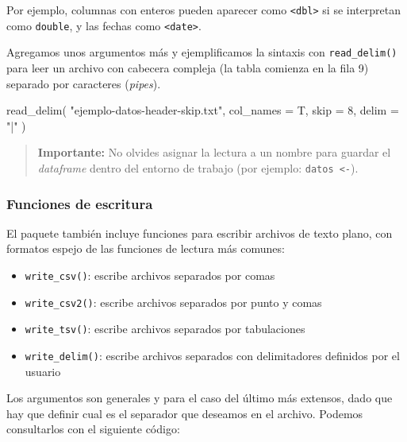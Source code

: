\documentclass[
  spanish,
  a4paper,
]{scrbook}
\newenvironment{Shaded}{\begin{snugshade}}{\end{snugshade}}
\newcommand{\AttributeTok}[1]{\textcolor[rgb]{0.40,0.45,0.13}{#1}}
\newcommand{\DecValTok}[1]{\textcolor[rgb]{0.68,0.00,0.00}{#1}}
\newcommand{\FunctionTok}[1]{\textcolor[rgb]{0.28,0.35,0.67}{#1}}
\newcommand{\NormalTok}[1]{\textcolor[rgb]{0.00,0.23,0.31}{#1}}
\newcommand{\StringTok}[1]{\textcolor[rgb]{0.13,0.47,0.30}{#1}}
\providecommand{\tightlist}{%
  \setlength{\itemsep}{0pt}\setlength{\parskip}{0pt}}
\begin{document}
Por ejemplo, columnas con enteros pueden aparecer como
\texttt{\textless{}dbl\textgreater{}} si se interpretan como
\texttt{double}, y las fechas como
\texttt{\textless{}date\textgreater{}}.

Agregamos unos argumentos más y ejemplificamos la sintaxis con
\texttt{read\_delim()} para leer un archivo con cabecera compleja (la
tabla comienza en la fila 9) separado por caracteres \texttt{\textbar{}}
(\emph{pipes}).

\begin{Shaded}
\begin{Highlighting}[]
\FunctionTok{read\_delim}\NormalTok{(}
  \StringTok{"ejemplo{-}datos{-}header{-}skip.txt"}\NormalTok{,}
  \AttributeTok{col\_names =}\NormalTok{ T,}
  \AttributeTok{skip =} \DecValTok{8}\NormalTok{,}
  \AttributeTok{delim =} \StringTok{"|"}
\NormalTok{)}
\end{Highlighting}
\end{Shaded}

\begin{quote}
\textbf{Importante:} No olvides asignar la lectura a un nombre para
guardar el \emph{dataframe} dentro del entorno de trabajo (por ejemplo:
\texttt{datos\ \textless{}-}).
\end{quote}

\subsubsection{Funciones de escritura}\label{funciones-de-escritura}

El paquete también incluye funciones para escribir archivos de texto
plano, con formatos espejo de las funciones de lectura más comunes:

\begin{itemize}
\tightlist
\item
  \texttt{write\_csv()}: escribe archivos separados por comas
\item
  \texttt{write\_csv2()}: escribe archivos separados por punto y comas
\item
  \texttt{write\_tsv()}: escribe archivos separados por tabulaciones
\item
  \texttt{write\_delim()}: escribe archivos separados con delimitadores
  definidos por el usuario
\end{itemize}

Los argumentos son generales y para el caso del último más extensos,
dado que hay que definir cual es el separador que deseamos en el
archivo. Podemos consultarlos con el siguiente código:
\end{document}
